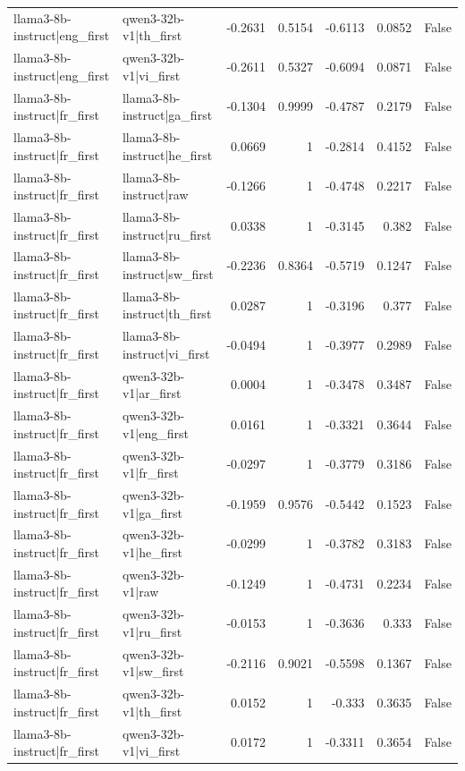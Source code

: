 \begin{table}
\begin{tabular}{l l r r r r l}
llama3-8b-instruct|eng_first & qwen3-32b-v1|th_first & -0.2631 & 0.5154 & -0.6113 & 0.0852 & False \\
llama3-8b-instruct|eng_first & qwen3-32b-v1|vi_first & -0.2611 & 0.5327 & -0.6094 & 0.0871 & False \\
llama3-8b-instruct|fr_first & llama3-8b-instruct|ga_first & -0.1304 & 0.9999 & -0.4787 & 0.2179 & False \\
llama3-8b-instruct|fr_first & llama3-8b-instruct|he_first & 0.0669 & 1 & -0.2814 & 0.4152 & False \\
llama3-8b-instruct|fr_first & llama3-8b-instruct|raw & -0.1266 & 1 & -0.4748 & 0.2217 & False \\
llama3-8b-instruct|fr_first & llama3-8b-instruct|ru_first & 0.0338 & 1 & -0.3145 & 0.382 & False \\
llama3-8b-instruct|fr_first & llama3-8b-instruct|sw_first & -0.2236 & 0.8364 & -0.5719 & 0.1247 & False \\
llama3-8b-instruct|fr_first & llama3-8b-instruct|th_first & 0.0287 & 1 & -0.3196 & 0.377 & False \\
llama3-8b-instruct|fr_first & llama3-8b-instruct|vi_first & -0.0494 & 1 & -0.3977 & 0.2989 & False \\
llama3-8b-instruct|fr_first & qwen3-32b-v1|ar_first & 0.0004 & 1 & -0.3478 & 0.3487 & False \\
llama3-8b-instruct|fr_first & qwen3-32b-v1|eng_first & 0.0161 & 1 & -0.3321 & 0.3644 & False \\
llama3-8b-instruct|fr_first & qwen3-32b-v1|fr_first & -0.0297 & 1 & -0.3779 & 0.3186 & False \\
llama3-8b-instruct|fr_first & qwen3-32b-v1|ga_first & -0.1959 & 0.9576 & -0.5442 & 0.1523 & False \\
llama3-8b-instruct|fr_first & qwen3-32b-v1|he_first & -0.0299 & 1 & -0.3782 & 0.3183 & False \\
llama3-8b-instruct|fr_first & qwen3-32b-v1|raw & -0.1249 & 1 & -0.4731 & 0.2234 & False \\
llama3-8b-instruct|fr_first & qwen3-32b-v1|ru_first & -0.0153 & 1 & -0.3636 & 0.333 & False \\
llama3-8b-instruct|fr_first & qwen3-32b-v1|sw_first & -0.2116 & 0.9021 & -0.5598 & 0.1367 & False \\
llama3-8b-instruct|fr_first & qwen3-32b-v1|th_first & 0.0152 & 1 & -0.333 & 0.3635 & False \\
llama3-8b-instruct|fr_first & qwen3-32b-v1|vi_first & 0.0172 & 1 & -0.3311 & 0.3654 & False \\

\end{tabular}
\end{table}
